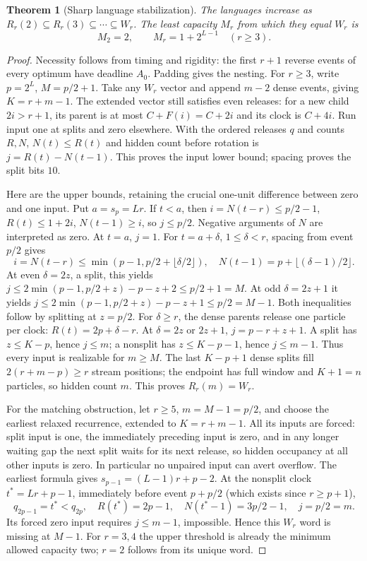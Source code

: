 \documentclass[11pt]{article}
\newtheorem{theorem}{Theorem}
\begin{document}
\begin{theorem}[Sharp language stabilization]\label{thm:language}
The languages increase as
$R_r(2)\subseteq R_r(3)\subseteq\cdots\subseteq W_r$.
The least capacity $M_r$ from which they equal $W_r$ is
\[
M_2=2,\qquad M_r=1+2^{L-1}\quad(r\ge3).
\]
\end{theorem}
\begin{proof}
Necessity follows from timing and rigidity: the first $r+1$ reverse
events of every optimum have deadline $A_0$. Padding gives the nesting.
For $r\ge3$, write $p=2^L$, $M=p/2+1$. Take any $W_r$ vector and
append $m-2$ dense events, giving $K=r+m-1$. The extended vector still
satisfies even releases: for a new child $2i>r+1$, its parent is at most
$C+F(i)=C+2i$ and its clock is $C+4i$. Run input one at splits and zero
elsewhere. With the ordered releases $q$ and counts $R,N$, $N(t)\le R(t)$
and hidden count before rotation is $j=R(t)-N(t-1)$. This proves the
input lower bound; spacing proves the split bits $10$.

Here are the upper bounds, retaining the crucial one-unit difference
between zero and one input. Put $a=s_p=Lr$. If $t<a$, then
$i=N(t-r)\le p/2-1$, $R(t)\le1+2i$, $N(t-1)\ge i$, so $j\le p/2$.
Negative arguments of $N$ are interpreted as zero. At $t=a$, $j=1$.
For $t=a+\delta$, $1\le\delta<r$, spacing from event $p/2$ gives
\[
i=N(t-r)\le\min(p-1,p/2+\lfloor\delta/2\rfloor),\quad
N(t-1)=p+\lfloor(\delta-1)/2\rfloor.
\]
At even $\delta=2z$, a split, this yields
$j\le2\min(p-1,p/2+z)-p-z+2\le p/2+1=M$.
At odd $\delta=2z+1$ it yields
$j\le2\min(p-1,p/2+z)-p-z+1\le p/2=M-1$.
Both inequalities follow by splitting at $z=p/2$.
For $\delta\ge r$, the dense parents release one particle per clock:
$R(t)=2p+\delta-r$. At $\delta=2z$ or $2z+1$, $j=p-r+z+1$.
A split has $z\le K-p$, hence $j\le m$; a nonsplit has
$z\le K-p-1$, hence $j\le m-1$. Thus every input is realizable for
$m\ge M$. The last $K-p+1$ dense splits fill
$2(r+m-p)\ge r$ stream positions; the endpoint has full window and
$K+1=n$ particles, so hidden count $m$. This proves $R_r(m)=W_r$.

For the matching obstruction, let $r\ge5$, $m=M-1=p/2$, and choose
the earliest relaxed recurrence, extended to $K=r+m-1$. All its inputs
are forced: split input is one, the immediately preceding input is zero,
and in any longer waiting gap the next split waits for its next release,
so hidden occupancy at all other inputs is zero. In particular no
unpaired input can avert overflow. The earliest formula gives
$s_{p-1}=(L-1)r+p-2$. At the nonsplit clock
$t^*=Lr+p-1$, immediately before event $p+p/2$ (which exists since
$r\ge p+1$),
\[
q_{2p-1}=t^*<q_{2p},\quad R(t^*)=2p-1,\quad
N(t^*-1)=3p/2-1,\quad j=p/2=m.
\]
Its forced zero input requires $j\le m-1$, impossible. Hence this $W_r$
word is missing at $M-1$. For $r=3,4$ the upper threshold is already
the minimum allowed capacity two; $r=2$ follows from its unique word.
\end{proof}
\end{document}
